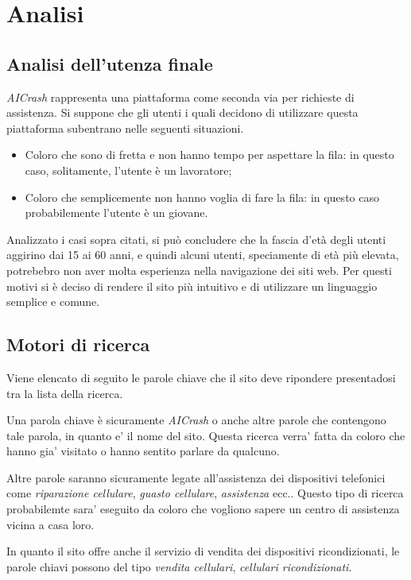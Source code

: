 \section{Analisi}

\subsection{Analisi dell'utenza finale}
\textit{AICrash} rappresenta una piattaforma come seconda via per richieste di assistenza.
Si suppone che gli utenti i quali decidono di utilizzare questa piattaforma subentrano nelle seguenti situazioni.
\begin{itemize}
	\item Coloro che sono di fretta e non hanno tempo per aspettare la fila: in
	questo caso, solitamente, l'utente è un lavoratore;
	\item Coloro che semplicemente non hanno voglia di fare la fila: in questo caso
	probabilemente l'utente è un giovane.
\end{itemize}

Analizzato i casi sopra citati, si può concludere che la fascia d'età degli utenti aggirino dai 15 ai 60
anni, e quindi alcuni utenti, speciamente di età più elevata, potrebebro non aver molta esperienza 
nella navigazione dei siti web. Per questi motivi si è deciso di rendere il sito più intuitivo e di 
utilizzare un linguaggio semplice e comune.

\subsection{Motori di ricerca}
Viene elencato di seguito le parole chiave che il sito deve ripondere presentadosi
tra la lista della ricerca.

Una parola chiave è sicuramente \textit{AICrash} o anche altre parole che contengono tale parola, in quanto
e' il nome del sito. Questa ricerca verra' fatta da coloro che hanno gia' visitato o hanno sentito parlare da qualcuno.

Altre parole saranno sicuramente legate all'assistenza dei dispositivi telefonici come \textit{riparazione cellulare}, \textit{guasto cellulare},
\textit{assistenza} ecc..
Questo tipo di ricerca probabilemte sara' eseguito da coloro che vogliono sapere un centro di assistenza vicina a casa loro.

In quanto il sito offre anche il servizio di vendita dei dispositivi ricondizionati, le parole chiavi possono del tipo
\textit{vendita cellulari}, \textit{cellulari ricondizionati}.

